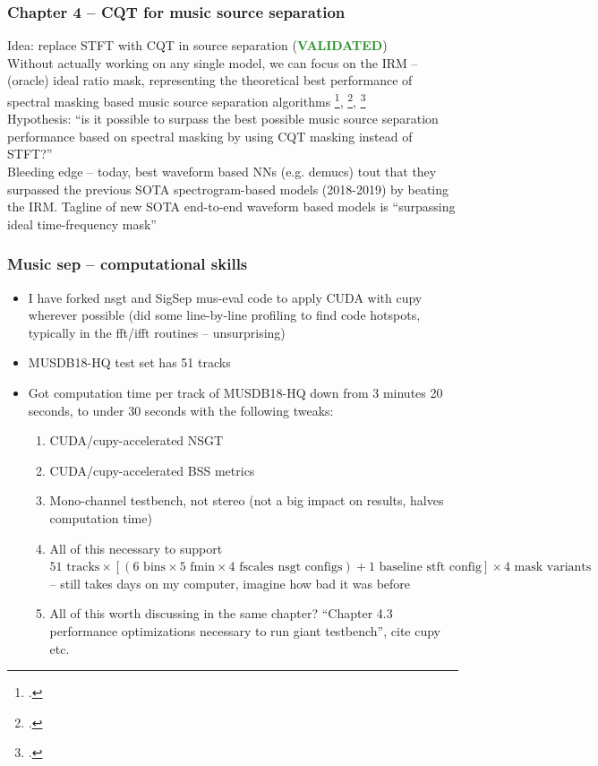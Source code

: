 \documentclass[usenames,dvipsnames]{beamer}
\begin{document}
\begin{frame}
	\frametitle{Chapter 4 -- CQT for music source separation}
	Idea: replace STFT with CQT in source separation (\textcolor{ForestGreen}{\textbf{VALIDATED}})\\
	\vspace{0.5em}
	Without actually working on any single model, we can focus on the IRM -- (oracle) ideal ratio mask, representing the theoretical  best performance of spectral masking based music source separation algorithms \footcite{irm}, \footcite{sigsep2018}, \footcite{vincent07}\\
	\vspace{0.5em}
	Hypothesis: ``is it possible to surpass the best possible music source separation performance based on spectral masking by using CQT masking instead of STFT?''\\
	\vspace{0.5em}
	Bleeding edge -- today, best waveform based NNs (e.g. demucs) tout that they surpassed the previous SOTA spectrogram-based models (2018-2019) by beating the IRM. Tagline of new SOTA end-to-end waveform based models is ``surpassing ideal time-frequency mask''
\end{frame}

\begin{frame}
	\frametitle{Music sep -- computational skills}
	\begin{itemize}
		\item
			I have forked nsgt and SigSep mus-eval code to apply CUDA with cupy wherever possible (did some line-by-line profiling to find code hotspots, typically in the fft/ifft routines -- unsurprising)
		\item
			MUSDB18-HQ test set has 51 tracks
		\item
			Got computation time per track of MUSDB18-HQ down from 3 minutes 20 seconds, to under 30 seconds with the following tweaks:
			\begin{enumerate}
				\item
					CUDA/cupy-accelerated NSGT
				\item
					CUDA/cupy-accelerated BSS metrics
				\item
					Mono-channel testbench, not stereo (not a big impact on results, halves computation time)
				\item
					All of this necessary to support $51 \text{ tracks} \times [(6 \text{ bins} \times 5 \text{ fmin} \times 4 \text{ fscales} \text{ nsgt configs}) + 1 \text{ baseline stft config}] \times 4 \text{ mask variants}$ -- still takes days on my computer, imagine how bad it was before
				\item
					All of this worth discussing in the same chapter? ``Chapter 4.3 performance optimizations necessary to run giant testbench'', cite cupy etc.
			\end{enumerate}
	\end{itemize}
\end{frame}
\end{document}
